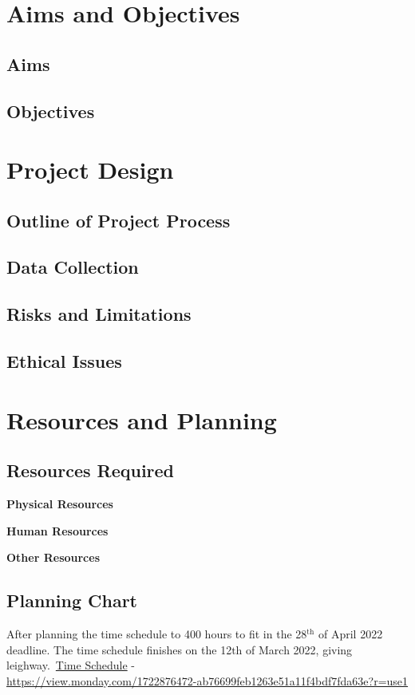 \documentclass[conference]{IEEEtran}
\begin{document}
    \section{Aims and Objectives}
      \subsection{Aims}
      
      \subsection{Objectives}

    \section{Project Design}
      \subsection{Outline of Project Process}
      \subsection{Data Collection}
      \subsection{Risks and Limitations}
      \subsection{Ethical Issues}
    \section{Resources and Planning}
      \subsection{Resources Required}
        \textbf{Physical Resources}

        \textbf{Human Resources}

        \textbf{Other Resources}
      \subsection{Planning Chart}
        After planning the time schedule to 400 hours to fit in the 28$^{\text{th}}$ of April 2022 deadline. The time schedule finishes on the 12${\text{th}}$ of March 2022, giving leighway.~\href{https://view.monday.com/1722876472-ab76699feb1263e51a11f4bdf7fda63e?r=use1}{Time Schedule} - \\\url{https://view.monday.com/1722876472-ab76699feb1263e51a11f4bdf7fda63e?r=use1}
	\nocite{*}
	\renewcommand\refname{\section{Reference List}}
	\small{
    }
\end{document}
